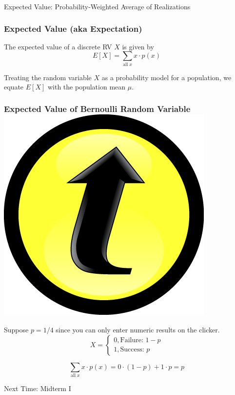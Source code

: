 \documentclass[handout]{beamer}
\begin{document}
\begin{frame}
\centering \Huge Expected Value: Probability-Weighted Average of Realizations

\end{frame}
\begin{frame}
\frametitle{Expected Value (aka Expectation)}
The expected value of a discrete RV $X$ is given by
	$$E[X] = \sum_{\mbox{all} \; x} x \cdot p(x)$$
	
 
	
	\vspace{2em}
\begin{alertblock}{Treating the random variable $X$ as a probability model for a population, we equate $E[X]$ with the population mean $\mu$.}\end{alertblock}
\end{frame}
\begin{frame}
\frametitle{Expected Value of Bernoulli Random Variable\hfill \includegraphics[scale = 0.05]{./images/clicker}}

Suppose $p = 1/4$ since you can only enter numeric results on the clicker.
$$X = \left\{ \begin{array}{l}  0, \mbox{Failure: } 1-p\\ 1, \mbox{Success: } p\end{array} \right.$$

\pause
\vspace{2em}
 
$$\sum_{\mbox{all} \; x} x \cdot p(x) = 0 \cdot (1-p) + 1 \cdot p = p$$
\end{frame}

\begin{frame}
	\begin{center}
		\Huge Next Time: Midterm I
	\end{center}
\end{frame}
\end{document}
